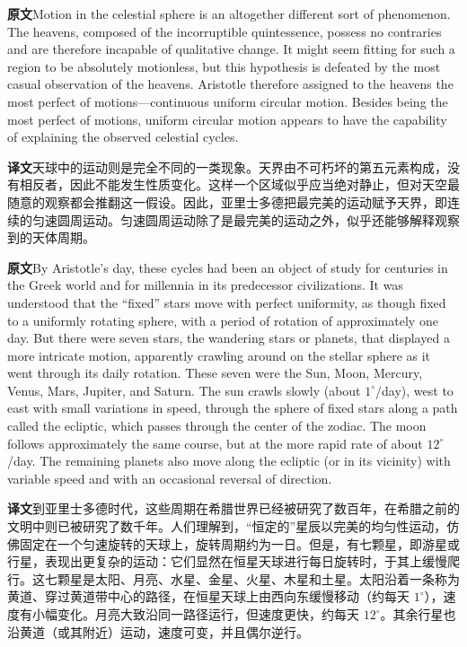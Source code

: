 \documentclass[UTF8,zihao=-4]{ctexart}
\newcommand{\BodyFont}{\fontsize{10.5pt}{15.5pt}\selectfont}
\newcommand{\origlabel}{\textbf{原文}\quad}
\newcommand{\translabel}{\textbf{译文}\quad}
\newcommand{\orig}{\par\noindent\begingroup\BodyFont\origlabel}
\newcommand{\zhline}[1]{\par\endgroup\noindent\begingroup\BodyFont\translabel #1\par\endgroup\vspace{0.35em}}
\begin{document}
\orig Motion in the celestial sphere is an altogether different sort of phenomenon. The heavens, composed of the incorruptible quintessence, possess no contraries and are therefore incapable of qualitative change. It might seem fitting for such a region to be absolutely motionless, but this hypothesis is defeated by the most casual observation of the heavens. Aristotle therefore assigned to the heavens the most perfect of motions---continuous uniform circular motion. Besides being the most perfect of motions, uniform circular motion appears to have the capability of explaining the observed celestial cycles.

\zhline{天球中的运动则是完全不同的一类现象。天界由不可朽坏的第五元素构成，没有相反者，因此不能发生性质变化。这样一个区域似乎应当绝对静止，但对天空最随意的观察都会推翻这一假设。因此，亚里士多德把最完美的运动赋予天界，即连续的匀速圆周运动。匀速圆周运动除了是最完美的运动之外，似乎还能够解释观察到的天体周期。}

\orig By Aristotle's day, these cycles had been an object of study for centuries in the Greek world and for millennia in its predecessor civilizations. It was understood that the ``fixed'' stars move with perfect uniformity, as though fixed to a uniformly rotating sphere, with a period of rotation of approximately one day. But there were seven stars, the wandering stars or planets, that displayed a more intricate motion, apparently crawling around on the stellar sphere as it went through its daily rotation. These seven were the Sun, Moon, Mercury, Venus, Mars, Jupiter, and Saturn. The sun crawls slowly (about $1^\circ$/day), west to east with small variations in speed, through the sphere of fixed stars along a path called the ecliptic, which passes through the center of the zodiac. The moon follows approximately the same course, but at the more rapid rate of about $12^\circ$/day. The remaining planets also move along the ecliptic (or in its vicinity) with variable speed and with an occasional reversal of direction.

\zhline{到亚里士多德时代，这些周期在希腊世界已经被研究了数百年，在希腊之前的文明中则已被研究了数千年。人们理解到，“恒定的”星辰以完美的均匀性运动，仿佛固定在一个匀速旋转的天球上，旋转周期约为一日。但是，有七颗星，即游星或行星，表现出更复杂的运动：它们显然在恒星天球进行每日旋转时，于其上缓慢爬行。这七颗星是太阳、月亮、水星、金星、火星、木星和土星。太阳沿着一条称为黄道、穿过黄道带中心的路径，在恒星天球上由西向东缓慢移动（约每天 $1^\circ$），速度有小幅变化。月亮大致沿同一路径运行，但速度更快，约每天 $12^\circ$。其余行星也沿黄道（或其附近）运动，速度可变，并且偶尔逆行。}
\end{document}
